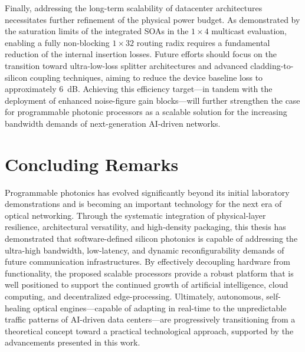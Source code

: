 Finally, addressing the long-term scalability of datacenter architectures necessitates further 
refinement of the physical power budget.
As demonstrated by the saturation limits of the integrated SOAs in the $1\times4$ multicast 
evaluation, enabling a fully non-blocking $1\times32$ routing radix requires a fundamental 
reduction of the internal insertion losses.
Future efforts should focus on the transition toward ultra-low-loss splitter architectures and 
advanced cladding-to-silicon coupling techniques, aiming to reduce the device baseline loss to 
approximately 6~dB.
Achieving this efficiency target—in tandem with the deployment of enhanced noise-figure gain 
blocks—will further strengthen the case for programmable photonic processors as a scalable solution 
for the increasing bandwidth demands of next-generation AI-driven networks.

\section{Concluding Remarks}
\label{sec:ch6_concluding_remarks}

Programmable photonics has evolved significantly beyond its initial laboratory demonstrations and 
is becoming an important technology for the next era of optical networking.
Through the systematic integration of physical-layer resilience, architectural versatility, and 
high-density packaging, this thesis has demonstrated that software-defined silicon photonics is 
capable of addressing the ultra-high bandwidth, low-latency, and dynamic reconfigurability demands 
of future communication infrastructures.
By effectively decoupling hardware from functionality, the proposed scalable processors provide a 
robust platform that is well positioned to support the continued growth of artificial intelligence, 
cloud computing, and decentralized edge-processing.
Ultimately, autonomous, self-healing optical engines—capable of adapting in real-time to the 
unpredictable traffic patterns of AI-driven data centers—are progressively transitioning from a 
theoretical concept toward a practical technological approach, supported by the advancements 
presented in this work.
